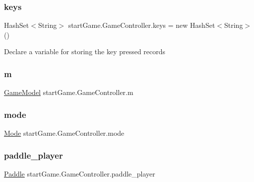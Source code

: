 \subsubsection{\texorpdfstring{keys}{keys}}
{\footnotesize\ttfamily Hash\+Set$<$String$>$ start\+Game.\+Game\+Controller.\+keys = new Hash\+Set$<$String$>$()}

Declare a variable for storing the key pressed records \hypertarget{classstart_game_1_1_game_controller_a2c79234f85f979b8f1efe5a48893560d}{}\label{classstart_game_1_1_game_controller_a2c79234f85f979b8f1efe5a48893560d} 
\subsubsection{\texorpdfstring{m}{m}}
{\footnotesize\ttfamily \hyperlink{classmodel_1_1_game_model}{Game\+Model} start\+Game.\+Game\+Controller.\+m\hspace{0.3cm}{\ttfamily [private]}}

\hypertarget{classstart_game_1_1_game_controller_ad46f15cbc3846c80495ca340b3b1dedc}{}\label{classstart_game_1_1_game_controller_ad46f15cbc3846c80495ca340b3b1dedc} 
\subsubsection{\texorpdfstring{mode}{mode}}
{\footnotesize\ttfamily \hyperlink{classview_1_1_mode}{Mode} start\+Game.\+Game\+Controller.\+mode\hspace{0.3cm}{\ttfamily [private]}}

\hypertarget{classstart_game_1_1_game_controller_a4dc3f50458dc835c6fa67be53fd1751b}{}\label{classstart_game_1_1_game_controller_a4dc3f50458dc835c6fa67be53fd1751b} 
\subsubsection{\texorpdfstring{paddle\+\_\+player}{paddle\_player}}
{\footnotesize\ttfamily \hyperlink{classmodel_1_1_paddle}{Paddle} start\+Game.\+Game\+Controller.\+paddle\+\_\+player\hspace{0.3cm}{\ttfamily [private]}}

